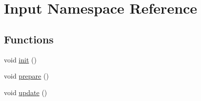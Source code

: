 \hypertarget{namespace_input}{}\section{Input Namespace Reference}
\label{namespace_input}
\subsection*{Functions}
\begin{DoxyCompactItemize}
\item 
void \mbox{\hyperlink{namespace_input_a4c2078b689fc3b5cfa1887bfb3aa02a6}{init}} ()
\item 
void \mbox{\hyperlink{namespace_input_a54c493c965c2acd755b8469156f086fb}{prepare}} ()
\item 
void \mbox{\hyperlink{namespace_input_aa7fe26710dd863d11737bf2f6de4ad05}{update}} ()
\end{DoxyCompactItemize}
